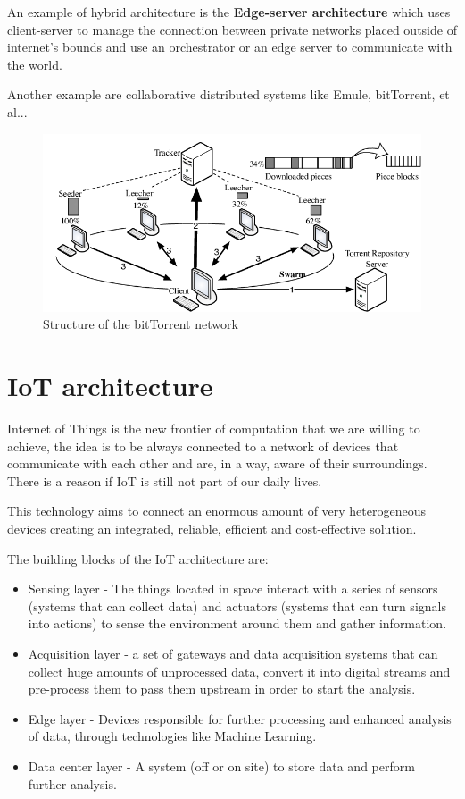 An example of hybrid architecture is the \textbf{Edge-server architecture} which uses client-server to manage the connection between private networks placed outside of internet's bounds and use an orchestrator or an edge server to communicate with the world.

Another example are collaborative distributed systems like Emule, bitTorrent, et al...
\begin{figure}[htb]
    \centering
    \includegraphics[scale=0.45]{img/bittorrent.png}
    \caption{Structure of the bitTorrent network}
\end{figure}

\section{IoT architecture}
Internet of Things is the new frontier of computation that we are willing to achieve, the idea is to be always connected to a network of devices that communicate with each other and are, in a way, aware of their surroundings. There is a reason if IoT is still not part of our daily lives.

This technology aims to connect an enormous amount of very heterogeneous devices creating an integrated, reliable, efficient and cost-effective solution.

The building blocks of the IoT architecture are:
\begin{itemize}
    \item Sensing layer - The things located in space interact with a series of sensors (systems that can collect data) and actuators (systems that can turn signals into actions) to sense the environment around them and gather information.
    \item Acquisition layer - a set of gateways and data acquisition systems that can collect huge amounts of unprocessed data, convert it into digital streams and pre-process them to pass them upstream in order to start the analysis.
    \item Edge layer - Devices responsible for further processing and enhanced analysis of data, through technologies like Machine Learning.
    \item Data center layer - A system (off or on site) to store data and perform further analysis.
\end{itemize}

